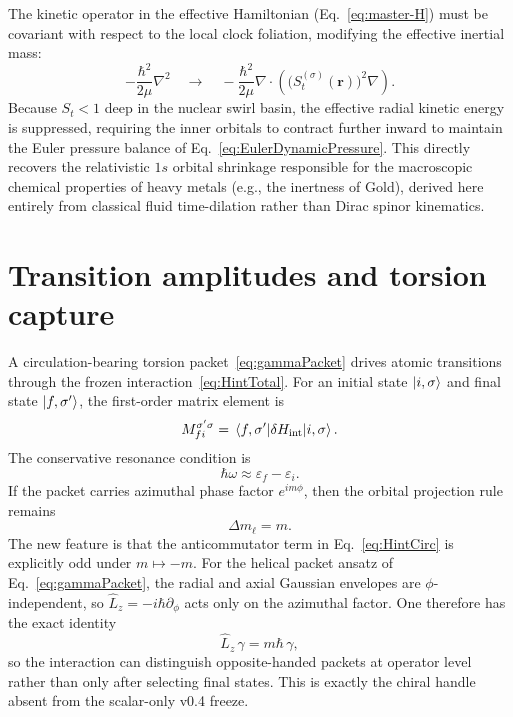 \documentclass[11pt,a4paper]{article}
\begin{document}
The kinetic operator in the effective Hamiltonian (Eq.~\eqref{eq:master-H}) must be covariant with respect to the local clock foliation, modifying the effective inertial mass:
\begin{equation}
\label{eq:Hkin_HighZ}
-\frac{\hbar^2}{2\mu}\nabla^2 \quad \longrightarrow \quad -\frac{\hbar^2}{2\mu} \nabla \cdot \left( \bigl(S_t^{(\sigma)}(\mathbf r)\bigr)^2 \nabla \right).
\end{equation}
Because $S_t < 1$ deep in the nuclear swirl basin, the effective radial kinetic energy is suppressed, requiring the inner orbitals to contract further inward to maintain the Euler pressure balance of Eq.~\eqref{eq:EulerDynamicPressure}. This directly recovers the relativistic $1s$ orbital shrinkage responsible for the macroscopic chemical properties of heavy metals (e.g., the inertness of Gold), derived here entirely from classical fluid time-dilation rather than Dirac spinor kinematics.

\section{Transition amplitudes and torsion capture}
A circulation-bearing torsion packet~\eqref{eq:gammaPacket} drives atomic transitions through the frozen interaction~\eqref{eq:HintTotal}. For an initial state $\ket{i,\sigma}$ and final state $\ket{f,\sigma'}$, the first-order matrix element is
\begin{equation}
\label{eq:Mfi}
M_{fi}^{\sigma'\sigma}=\matrixel{f,\sigma'}{\delta H_{\rm int}}{i,\sigma}.
\end{equation}
The conservative resonance condition is
\begin{equation}
\label{eq:resonance}
\hbar\omega \approx \varepsilon_f-\varepsilon_i.
\end{equation}
If the packet carries azimuthal phase factor $e^{im\phi}$, then the orbital projection rule remains
\begin{equation}
\label{eq:dm}
\Delta m_\ell = m.
\end{equation}
The new feature is that the anticommutator term in Eq.~\eqref{eq:HintCirc} is explicitly odd under $m\mapsto -m$. For the helical packet ansatz of Eq.~\eqref{eq:gammaPacket}, the radial and axial Gaussian envelopes are $\phi$-independent, so $\hat L_z=-i\hbar\partial_\phi$ acts only on the azimuthal factor. One therefore has the exact identity
\begin{equation}
\label{eq:Lzgamma}
\hat L_z\,\gamma = m\hbar\,\gamma,
\end{equation}
so the interaction can distinguish opposite-handed packets at operator level rather than only after selecting final states. This is exactly the chiral handle absent from the scalar-only v0.4 freeze.
\end{document}
